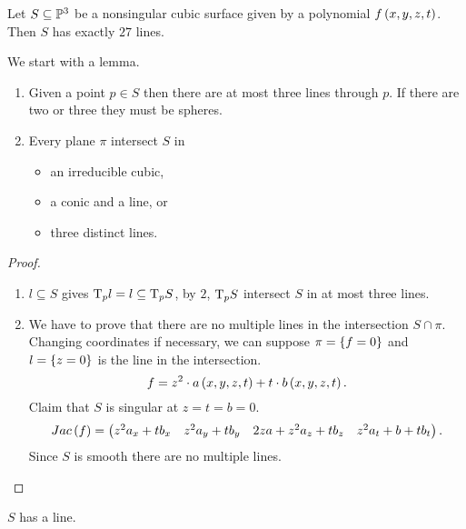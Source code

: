
\begin{theorem}
Let $ S \subseteq \mathbb{P}^3 $ be a nonsingular cubic surface given by a polynomial $ f\br{x, y, z, t} $. Then $ S $ has exactly $ 27 $ lines.
\end{theorem}

We start with a lemma.

\begin{lemma}
\hfill
\begin{enumerate}
\item Given a point $ p \in S $ then there are at most three lines through $ p $. If there are two or three they must be spheres.
\item Every plane $ \pi $ intersect $ S $ in
\begin{itemize}
\item an irreducible cubic,
\item a conic and a line, or
\item three distinct lines.
\end{itemize}
\end{enumerate}
\end{lemma}

\begin{proof}
\hfill
\begin{enumerate}
\item $ l \subseteq S $ gives $ \mathrm{T}_p l = l \subseteq \mathrm{T}_p S $, by $ 2 $, $ \mathrm{T}_p S $ intersect $ S $ in at most three lines.
\item We have to prove that there are no multiple lines in the intersection $ S \cap \pi $. Changing coordinates if necessary, we can suppose $ \pi = \cbr{f = 0} $ and $ l = \cbr{z = 0} $ is the line in the intersection.
$$ f = z^2 \cdot a\br{x, y, z, t} + t \cdot b\br{x, y, z, t}. $$
Claim that $ S $ is singular at $ z = t = b = 0 $.
$$ Jac\br{f} = \onebytwo{z^2a_x + tb_x & z^2a_y + tb_y}{2za + z^2a_z + tb_z & z^2a_t + b + tb_t}. $$
Since $ S $ is smooth there are no multiple lines.
\end{enumerate}
\end{proof}

\begin{lemma}
$ S $ has a line.
\end{lemma}

